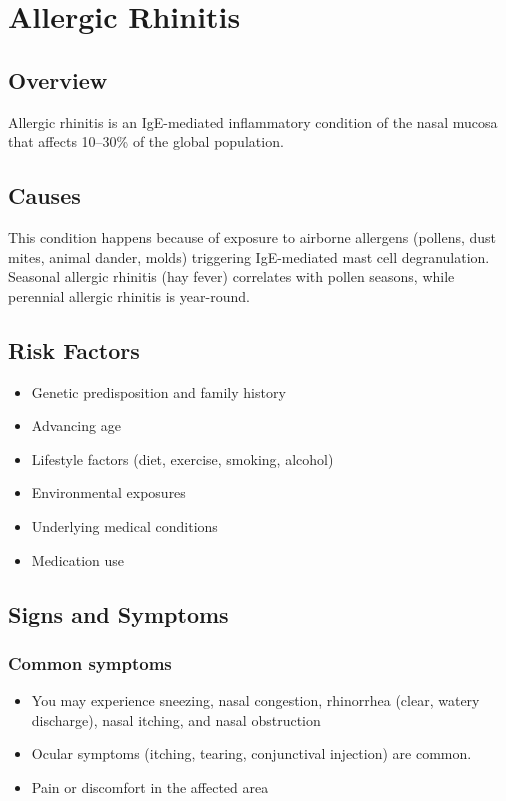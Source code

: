 \chapter{Allergic Rhinitis}
\label{sec:Allergic Rhinitis}

\section{Overview}
Allergic rhinitis is an IgE-mediated inflammatory condition of the nasal mucosa that affects 10--30\% of the global population.
\section{Causes}
This condition happens because of exposure to airborne allergens (pollens, dust mites, animal dander, molds) triggering IgE-mediated mast cell degranulation. Seasonal allergic rhinitis (hay fever) correlates with pollen seasons, while perennial allergic rhinitis is year-round.     
\section{Risk Factors}

\begin{itemize}[noitemsep]
  \item Genetic predisposition and family history
  \item Advancing age
  \item Lifestyle factors (diet, exercise, smoking, alcohol)
  \item Environmental exposures
  \item Underlying medical conditions
  \item Medication use
\end{itemize}
\section{Signs and Symptoms}

\subsection{Common symptoms}
\begin{itemize}[noitemsep]
  \item You may experience sneezing, nasal congestion, rhinorrhea (clear, watery discharge), nasal itching, and nasal obstruction
  \item Ocular symptoms (itching, tearing, conjunctival injection) are common.
  \item Pain or discomfort in the affected area
  \end{itemize}


